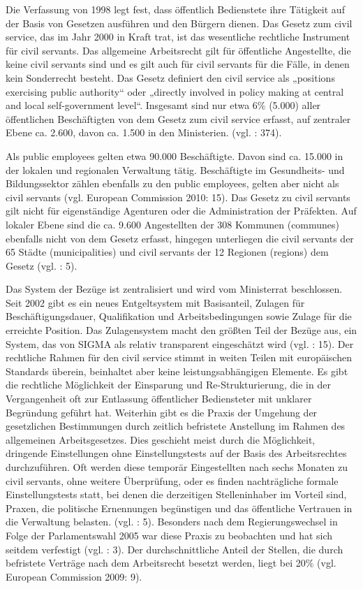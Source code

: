 Die Verfassung von 1998 legt fest, dass öffentlich Bedienstete ihre Tätigkeit auf der Basis von Gesetzen ausführen und den Bürgern dienen. Das Gesetz zum civil service, das im Jahr 2000 in Kraft trat, ist das wesentliche rechtliche Instrument für civil servants. Das allgemeine Arbeitsrecht gilt für öffentliche Angestellte, die keine civil servants sind und es gilt auch für civil servants für die Fälle, in denen kein Sonderrecht besteht. Das Gesetz definiert den civil service als „positions exercising public authority“ oder „directly involved in policy making at central and local self-government level“. Insgesamt sind nur etwa 6\% (5.000) aller öffentlichen Beschäftigten von dem Gesetz zum civil service erfasst, auf zentraler Ebene ca. 2.600, davon ca. 1.500 in den Ministerien. (vgl. \cite{skarica} : 374).\par
Als public employees gelten etwa 90.000 Beschäftigte. Davon sind ca. 15.000 in der lokalen und regionalen Verwaltung tätig. Beschäftigte im Gesundheits- und Bildungssektor zählen ebenfalls zu den public employees, gelten aber nicht als civil servants (vgl. European Commission 2010: 15). Das Gesetz zu civil servants gilt nicht für eigenständige Agenturen oder die Administration der Präfekten. Auf lokaler Ebene sind die ca. 9.600 Angestellten der 308 Kommunen (communes) ebenfalls nicht von dem Gesetz erfasst, hingegen unterliegen die civil servants der 65 Städte (municipalities) und civil servants der 12 Regionen (regions) dem Gesetz (vgl. \cite{oecd09} : 5).\par
Das System der Bezüge ist zentralisiert und wird vom Ministerrat beschlossen. Seit 2002 gibt es ein neues Entgeltsystem mit Basisanteil, Zulagen für Beschäftigungsdauer, Qualifikation und Arbeitsbedingungen sowie Zulage für die erreichte Position. Das Zulagensystem macht den größten Teil der Bezüge aus, ein System, das von SIGMA als relativ transparent eingeschätzt wird (vgl.  \cite{oecd09} : 15). Der rechtliche Rahmen für den civil service stimmt in weiten Teilen mit europäischen Standards überein, beinhaltet aber keine leistungsabhängigen Elemente. Es gibt die rechtliche Möglichkeit der Einsparung und Re-Strukturierung, die in der Vergangenheit oft zur Entlassung öffentlicher Bediensteter mit unklarer Begründung geführt hat. Weiterhin gibt es die Praxis der Umgehung der gesetzlichen Bestimmungen durch zeitlich befristete Anstellung im Rahmen des allgemeinen Arbeitsgesetzes. Dies geschieht meist durch die Möglichkeit, dringende Einstellungen ohne Einstellungstests auf der Basis des Arbeitsrechtes durchzuführen. Oft werden diese temporär Eingestellten nach sechs Monaten zu civil servants, ohne weitere Überprüfung, oder es finden nachträgliche formale Einstellungstests statt, bei denen die derzeitigen Stelleninhaber im Vorteil sind, Praxen, die politische Ernennungen begünstigen und das öffentliche Vertrauen in die Verwaltung belasten. (vgl. \cite{oecd11a} : 5). Besonders nach dem Regierungswechsel in Folge der Parlamentswahl 2005 war diese Praxis zu beobachten und hat sich seitdem verfestigt (vgl.  \cite{oecd09} : 3). Der durchschnittliche Anteil der Stellen, die durch befristete Verträge nach dem Arbeitsrecht besetzt werden, liegt bei 20\% (vgl. European Commission 2009: 9).\par
